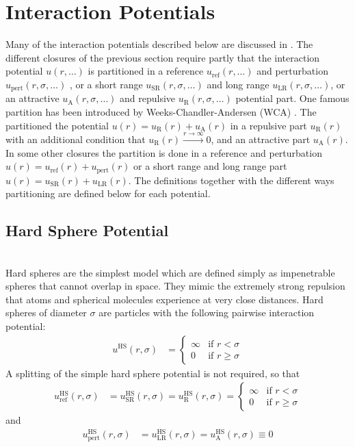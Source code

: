 \section{Interaction Potentials}

Many of the interaction potentials described below are discussed in \cite{Likos2001}.
The different closures of the previous section require partly that the interaction potential $u(r,\ldots)$
is partitioned in a reference $u_\text{ref}(r,\ldots)$ and perturbation $u_\text{pert}(r,\sigma,\ldots)$ ,
or a short range $u_\text{SR}(r,\sigma,\ldots)$
and long range $u_\text{LR}(r,\sigma,\ldots)$, or an attractive $u_\text{A}(r,\sigma,\ldots)$ and
repulsive $u_\text{R}(r,\sigma,\ldots)$ potential part.
One famous partition has been introduced by Weeks-Chandler-Andersen (WCA) \cite{Weeks1971}.
The partitioned the potential $u(r)=u_\text{R}(r)+u_\text{A}(r)$ in a repulsive part $u_\text{R}(r)$
with an additional condition that $u_\text{R}(r)  \xrightarrow{r\rightarrow\infty}0 $,
and an attractive part $u_\text{A}(r)$.
In some other closures the partition is done in a reference and perturbation $u(r)=u_\text{ref}(r)+u_\text{pert}(r)$
or a short range and long range part $u(r)=u_\text{SR}(r)+u_\text{LR}(r)$.
The definitions together with the different ways partitioning are defined below for
each potential.

\newpage
\subsection{Hard Sphere Potential}
~\\

Hard spheres are the simplest model which are defined simply as impenetrable spheres that cannot overlap
in space. They mimic the extremely strong repulsion that atoms and spherical molecules
experience at very close distances.
Hard spheres of diameter $\sigma$ are particles with the following pairwise interaction potential:
\begin{align}
u^\text{HS}(r,\sigma) &=
\begin{cases}
\infty  & \mbox{if } r <    \sigma \\
0       & \mbox{if } r \geq \sigma
\end{cases}
\end{align}
A splitting of the simple hard sphere potential is not required, so that
\begin{align}
u^\text{HS}_\text{ref}(r,\sigma) &= u^\text{HS}_\text{SR}(r,\sigma) = u^\text{HS}_\text{R}(r,\sigma) =
\begin{cases}
\infty  & \mbox{if } r <    \sigma \\
0       & \mbox{if } r \geq \sigma
\end{cases}
\end{align}
and
\begin{align}
u^\text{HS}_\text{pert}(r,\sigma) &= u^\text{HS}_\text{LR}(r,\sigma) = u^\text{HS}_\text{A}(r,\sigma) \equiv 0
\end{align}

